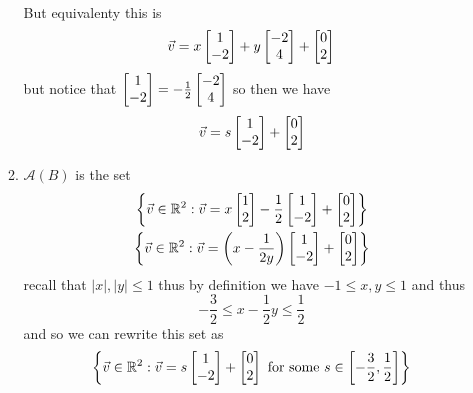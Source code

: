 \documentclass[11pt]{book}
\begin{document}
\begin{itemize}
\begin{enumerate}
\begin{gather*}
            \end{gather*}
            But equivalenty this is 
            \[
            \vec{v} = x\begin{bmatrix} 1 \\ -2 \end{bmatrix}  + y\begin{bmatrix} -2 \\ 4 \end{bmatrix}  + \begin{bmatrix} 0 \\ 2 \end{bmatrix} 
            \]
            but notice that $\begin{bmatrix} 1 \\ -2 \end{bmatrix} = -\frac{1}{2}\begin{bmatrix} -2 \\ 4 \end{bmatrix} $ so then we have
            \[
            \vec{v} = s\begin{bmatrix} 1 \\ -2 \end{bmatrix}  + \begin{bmatrix} 0 \\ 2 \end{bmatrix} 
            \]
        \item $\mathcal{A}\left(B\right) $ is the set
            \begin{gather*}
                \left\{ \vec{v} \in \mathbb{R} ^{2} :\vec{v} = x\begin{bmatrix} 1 \\ 2 \end{bmatrix} - \frac{1}{2}\begin{bmatrix} 1 \\ -2 \end{bmatrix}  + \begin{bmatrix} 0 \\ 2 \end{bmatrix}   \right\} \\
                \left\{ \vec{v} \in \mathbb{R} ^{2} :\vec{v} = \left( x - \frac{1}{2y} \right) \begin{bmatrix} 1 \\ -2 \end{bmatrix}  + \begin{bmatrix} 0 \\ 2 \end{bmatrix}  \right\} 
            \end{gather*}
            recall that $\left| x \right| , \left| y \right| \le 1$ thus by definition we have $-1 \le x,y \le 1$ and thus 
            \[
             - \frac{3}{2}\le x - \frac{1}{2}y\le \frac{1}{2}
            \]
            and so we can rewrite this set as 
            \[
                \left\{ \vec{v} \in \mathbb{R} ^2 :\vec{v} = s\begin{bmatrix} 1 \\ -2 \end{bmatrix} + \begin{bmatrix} 0 \\ 2 \end{bmatrix} \text{ for some  } s\in \left[ -\frac{3}{2},\frac{1}{2} \right]    \right\} 
            \]
            

\end{enumerate}
\end{itemize}
\end{document}
